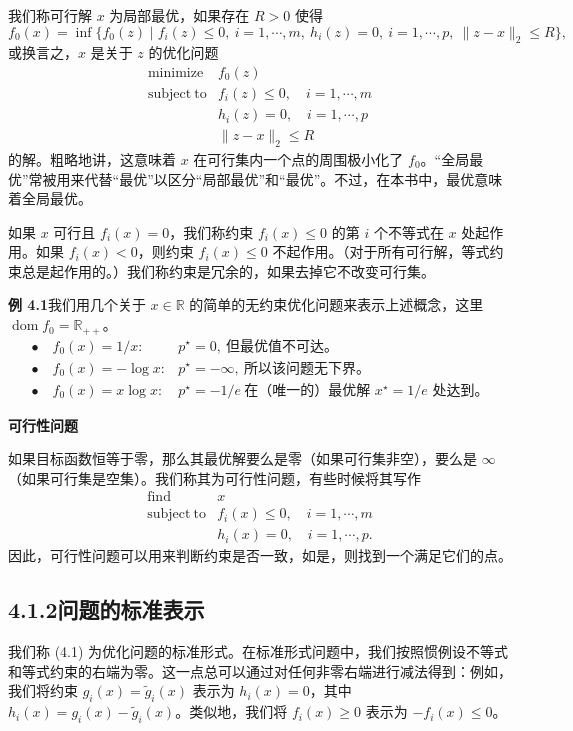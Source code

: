 \documentclass[UTF8,12pt,a4paper,fontset=fandol]{ctexart}
\begin{document}
我们称可行解 $x$ 为局部最优，如果存在 $R>0$ 使得
\[
f_0(x)=\inf\{f_0(z)\mid f_i(z)\leq 0,\ i=1,\cdots,m,\ h_i(z)=0,\ i=1,\cdots,p,\ \|z-x\|_2\leq R\},
\]
或换言之，$x$ 是关于 $z$ 的优化问题
\[
\begin{array}{ll}
\mathop{\mathrm{minimize}} & f_0(z)\\
\mathrm{subject\ to} & f_i(z)\leq 0,\quad i=1,\cdots,m\\
& h_i(z)=0,\quad i=1,\cdots,p\\
& \|z-x\|_2\leq R
\end{array}
\]
的解。粗略地讲，这意味着 $x$ 在可行集内一个点的周围极小化了 $f_0$。“全局最优”常被用来代替“最优”以区分“局部最优”和“最优”。不过，在本书中，最优意味着全局最优。

如果 $x$ 可行且 $f_i(x)=0$，我们称约束 $f_i(x)\leq 0$ 的第 $i$ 个不等式在 $x$ 处起作用。如果 $f_i(x)<0$，则约束 $f_i(x)\leq 0$ 不起作用。（对于所有可行解，等式约束总是起作用的。）我们称约束是冗余的，如果去掉它不改变可行集。

\noindent\textbf{例 4.1}\quad 我们用几个关于 $x\in\mathbb{R}$ 的简单的无约束优化问题来表示上述概念，这里 $\operatorname{dom} f_0=\mathbb{R}_{++}$。
\[
\begin{array}{ll}
\bullet\quad f_0(x)=1/x: & p^\star=0,\ \text{但最优值不可达。}\\
\bullet\quad f_0(x)=-\log x: & p^\star=-\infty,\ \text{所以该问题无下界。}\\
\bullet\quad f_0(x)=x\log x: & p^\star=-1/e\ \text{在（唯一的）最优解 }x^\star=1/e\text{ 处达到。}
\end{array}
\]

\noindent\textbf{可行性问题}

如果目标函数恒等于零，那么其最优解要么是零（如果可行集非空），要么是 $\infty$（如果可行集是空集）。我们称其为可行性问题，有些时候将其写作
\[
\begin{array}{ll}
\mathop{\mathrm{find}} & x\\
\mathrm{subject\ to} & f_i(x)\leq 0,\quad i=1,\cdots,m\\
& h_i(x)=0,\quad i=1,\cdots,p.
\end{array}
\]
因此，可行性问题可以用来判断约束是否一致，如是，则找到一个满足它们的点。

\subsection*{4.1.2\quad 问题的标准表示}

我们称 (4.1) 为优化问题的标准形式。在标准形式问题中，我们按照惯例设不等式和等式约束的右端为零。这一点总可以通过对任何非零右端进行减法得到：例如，我们将约束 $g_i(x)=\tilde{g}_i(x)$ 表示为 $h_i(x)=0$，其中 $h_i(x)=g_i(x)-\tilde{g}_i(x)$。类似地，我们将 $f_i(x)\geq 0$ 表示为 $-f_i(x)\leq 0$。
\end{document}

